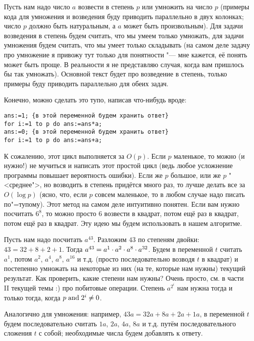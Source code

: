 Пусть нам надо число $a$ возвести в степень $p$ или умножить на число $p$ (примеры кода для 
умножения и возведения буду приводить параллельно в двух колонках; число $p$ должно быть 
натуральным, а $a$ может быть произвольным). Для задачи возведения в степень будем считать, что мы умеем 
только умножать, для задачи умножения будем считать, что мы умеет только складывать (на самом деле 
задачу про умножение я привожу тут только для понятности "--- мне кажется, её понять может быть проще. В 
реальности я не представляю случая, когда вам пришлось бы так умножать). Основной текст будет про 
возведение в степень, только примеры буду приводить параллельно для обеих задач.

Конечно, можно сделать это тупо, написав что-нибудь вроде:

\begin{codesample}\begin{verbatim}
ans:=1; {в этой переменной будем хранить ответ}
for i:=1 to p do ans:=ans*a;
ans:=0; {в этой переменной будем хранить ответ}
for i:=1 to p do ans:=ans+a;
\end{verbatim}
\end{codesample}

К сожалению, этот цикл выполняется за $O(p)$. Если $p$ маленькое, то можно (и нужно!) не мучиться и написать этот простой цикл 
(ведь любое усложнение программы повышает вероятность ошибки). Если же $p$ большое, или же $p$ 
"<среднее">, но возводить в степень придётся много раз, то лучше делать все за $O(\log p)$ (ясно, что, если $p$ совсем маленькое, то в 
любом случае надо писать по"=тупому). Этот метод на самом деле интуитивно понятен. Если вам нужно посчитать $6^8$, то можно просто $6$ 
возвести в квадрат, потом ещё раз в квадрат, потом ещё раз в квадрат. Эту идею мы будем использовать в нашем алгоритме.

Пусть нам надо посчитать $a^{43}$. Разложим $43$ по степеням двойки: $43 = 32 + 8 + 2 + 1$. Тогда 
$a^{43} \hm= a^1 \cdot a^2 \cdot a^8 \cdot a^{32}$. Будем в переменной $t$ считать $a^1$, потом $a^2$, 
$a^4$, $a^8$, $a^{16}$ и т.д. (просто последовательно возводя $t$ в квадрат) и постепенно 
умножать на некоторые из них (на те, которые нам нужны) текущий результат. Как проверить, 
какие степени нам нужны? Очень просто, см. в части II текущей темы :) про побитовые операции. 
Степень $a^{2^i}$ нам нужна тогда и только тогда, когда $p \mathrel{\mathrm{and}} 2^i \neq 0$.

{\small Аналогично для умножения: например, $43a=32a+8a+2a+1a$, в переменной $t$ будем 
последовательно считать $1a$, $2a$, $4a$, $8a$ и т.д. путём последовательного сложения $t$ с собой; 
необходимые числа будем добавлять к ответу.

}

